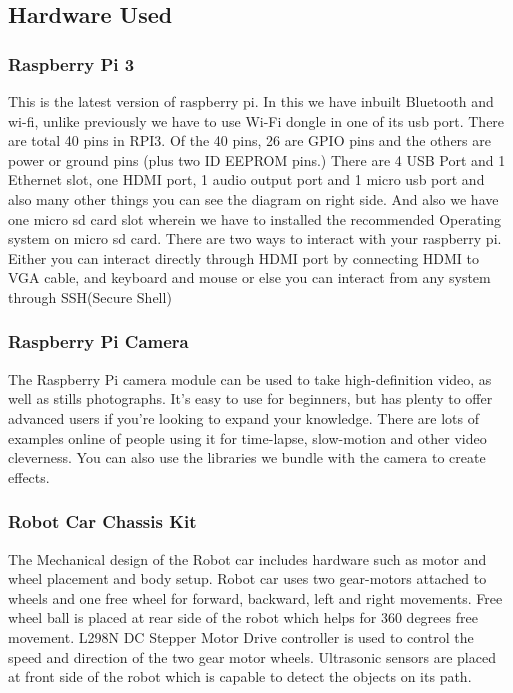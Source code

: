 \documentclass[sigconf]{acmart}
\begin{document}
\subsection{Hardware Used}
\subsubsection{Raspberry Pi 3}
This is the latest version of raspberry pi. In this we have inbuilt Bluetooth and wi-fi, unlike previously we have to use Wi-Fi dongle in one of its usb port. There are total 40 pins in RPI3. Of the 40 pins, 26 are GPIO pins and the others are power or ground pins (plus two ID EEPROM pins.) There are 4 USB Port and 1 Ethernet slot, one HDMI port, 1 audio output port and 1 micro usb port and also many other things you can see the diagram on right side. And also we have one micro sd card slot wherein we have to installed the recommended Operating system on micro sd card. There are two ways to interact with your raspberry pi. Either you can interact directly through HDMI port by connecting HDMI to VGA cable, and keyboard and mouse or else you can interact from any system through SSH(Secure Shell)

\subsubsection{Raspberry Pi Camera}
The Raspberry Pi camera module can be used to take high-definition video, as well as stills photographs. It’s easy to use for beginners, but has plenty to offer advanced users if you’re looking to expand your knowledge. There are lots of examples online of people using it for time-lapse, slow-motion and other video cleverness. You can also use the libraries we bundle with the camera to create effects.

\subsubsection{Robot Car Chassis Kit}
The Mechanical design of the Robot car includes hardware such as motor and wheel placement and body setup. Robot car uses two gear-motors attached to wheels and one free wheel for forward, backward, left and right movements. Free wheel ball is placed at rear side of the robot which helps for 360 degrees free movement. L298N DC Stepper Motor Drive controller is used to control the speed and direction of the two gear motor wheels. Ultrasonic sensors are placed at front side of the robot which is capable to detect the objects on its path.
\end{document}
